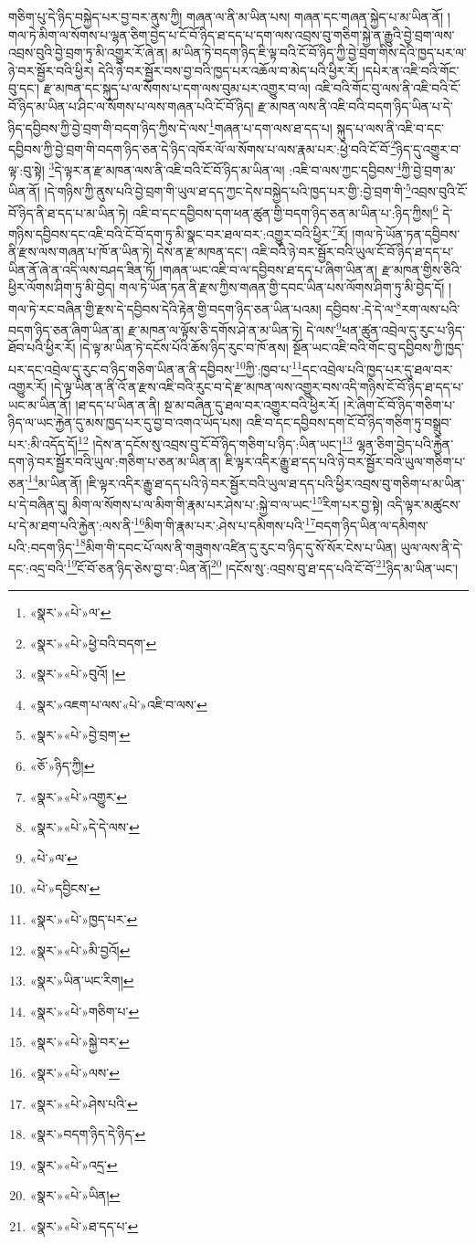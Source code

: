 གཅིག་པུ་དེ་ཉིད་བསྐྱེད་པར་བྱ་བར་ནུས་ཀྱི། གཞན་ལ་ནི་མ་ཡིན་པས། གཞན་དང་གཞན་སྐྱེད་པ་མ་ཡིན་ནོ། །གལ་ཏེ་མིག་ལ་སོགས་པ་ལྷན་ཅིག་བྱེད་པ་ངོ་བོ་ཉིད་ཐ་དད་པ་དག་ལས་འབྲས་བུ་གཅིག་སྐྱེ་ན་རྒྱུའི་བྱེ་བྲག་ལས་འབྲས་བུའི་བྱེ་བྲག་ཏུ་མི་འགྱུར་རོ་ཞེ་ན། མ་ཡིན་ཏེ་བདག་ཉིད་ཇི་ལྟ་བའི་ངོ་བོ་ཉིད་ཀྱི་བྱེ་བྲག་གིས་དེའི་ཁྱད་པར་ལ་ཉེ་བར་སྦྱོར་བའི་ཕྱིར། དེའི་ཉེ་བར་སྦྱོར་བས་བྱ་བའི་ཁྱད་པར་འཆོལ་བ་མེད་པའི་ཕྱིར་རོ། །དཔེར་ན་འཇི་བའི་གོང་བུ་དང་། རྫ་མཁན་དང་སྐུད་པ་ལ་སོགས་པ་དག་ལས་བུམ་པར་འགྱུར་བ་ལ། འཇི་བའི་གོང་བུ་ལས་ནི་འཇི་བའི་ངོ་བོ་ཉིད་མ་ཡིན་པ་ཤིང་ལ་སོགས་པ་ལས་གཞན་པའི་ངོ་བོ་ཉིད། རྫ་མཁན་ལས་ནི་འཇི་བའི་བདག་ཉིད་ཡིན་པ་དེ་ཉིད་དབྱིབས་ཀྱི་བྱེ་བྲག་གི་བདག་ཉིད་ཀྱིས་དེ་ལས་\footnote{«སྣར་»«པེ་»ལ་}གཞན་པ་དག་ལས་ཐ་དད་པ། སྐུད་པ་ལས་ནི་འཇི་བ་དང་དབྱིབས་ཀྱི་བྱེ་བྲག་གི་བདག་ཉིད་ཅན་དེ་ཉིད་འཁོར་ལོ་ལ་སོགས་པ་ལས་རྣམ་པར་:ཕྱེ་བའི་ངོ་བོ་\footnote{«སྣར་»«པེ་»ཕྱེ་བའི་བདག་}ཉིད་དུ་འགྱུར་བ་ལྟ་:བུ་སྟེ། \footnote{«སྣར་»«པེ་»བུའོ། ། }དེ་ལྟར་ན་རྫ་མཁན་ལས་ནི་འཇི་བའི་ངོ་བོ་ཉིད་མ་ཡིན་ལ། :འཇི་བ་ལས་ཀྱང་དབྱིབས་\footnote{«སྣར་»འཇག་པ་ལས་«པེ་»འཇི་བ་ལས་}ཀྱི་བྱེ་བྲག་མ་ཡིན་ནོ། །དེ་གཉིས་ཀྱི་ནུས་པའི་བྱེ་བྲག་གི་ཡུལ་ཐ་དད་ཀྱང་དེས་བསྐྱེད་པའི་ཁྱད་པར་གྱི་:བྱེ་བྲག་གི་\footnote{«སྣར་»«པེ་»བྱེ་བྲག་}འབྲས་བུའི་ངོ་བོ་ཉིད་ནི་ཐ་དད་པ་མ་ཡིན་ཏེ། འཇི་བ་དང་དབྱིབས་དག་ཕན་ཚུན་གྱི་བདག་ཉིད་ཅན་མ་ཡིན་པ་:ཉིད་ཀྱིས།\footnote{«ཅོ་»ཉིད་ཀྱི།} དེ་གཉིས་དབྱིབས་དང་འཇི་བའི་ངོ་བོ་དག་ཏུ་མི་སྣང་བར་ཐལ་བར་:འགྱུར་བའི་ཕྱིར་\footnote{«སྣར་»«པེ་»འགྱུར་}རོ། །གལ་ཏེ་ཡོན་ཏན་དབྱིབས་ནི་རྫས་ལས་གཞན་པ་ཁོ་ན་ཡིན་ཏེ། དེས་ན་རྫ་མཁན་དང་། འཇི་བའི་ཉེ་བར་སྦྱོར་བའི་ཡུལ་ངོ་བོ་ཉིད་ཐ་དད་པ་ཡིན་ནོ་ཞེ་ན་འདི་ལས་བཤད་ཟིན་ཏོ། །གཞན་ཡང་འཇི་བ་ལ་དབྱིབས་ཐ་དད་པ་ཞིག་ཡིན་ན། རྫ་མཁན་གྱིས་ཅིའི་ཕྱིར་ལོགས་ཤིག་ཏུ་མི་བྱེད། གལ་ཏེ་ཡོན་ཏན་ནི་རྫས་ཀྱིས་གཞན་གྱི་དབང་ཡིན་པས་ལོགས་ཤིག་ཏུ་མི་བྱེད་དོ། །གལ་ཏེ་རང་བཞིན་གྱི་རྫས་དེ་དབྱིབས་དེའི་རྟེན་གྱི་བདག་ཉིད་ཅན་ཡིན་པའམ། དབྱིབས་:དེ་དེ་ལ་\footnote{«སྣར་»«པེ་»དེ་དེ་ལས་}རག་ལས་པའི་བདག་ཉིད་ཅན་ཞིག་ཡིན་ན། རྫ་མཁན་ལ་ལྟོས་ཅི་དགོས་ཤེ་ན་མ་ཡིན་ཏེ། དེ་ལས་\footnote{«པེ་»ལ་}ཕན་ཚུན་འབྲེལ་དུ་རུང་པ་ཉིད་ཐོབ་པའི་ཕྱིར་རོ། །དེ་ལྟ་མ་ཡིན་ཏེ་དངོས་པོའི་ཆོས་ཉིད་རུང་བ་ཁོ་ནས། སྔོན་ཡང་འཇི་བའི་གོང་བུ་དབྱིབས་ཀྱི་ཁྱད་པར་དང་འབྲེལ་དུ་རུང་བ་ཉིད་གཅིག་ཡིན་ན་ནི་དབྱིབས་\footnote{«པེ་»དབྱིངས་}ཀྱི་:ཁྱབ་པ་\footnote{«སྣར་»«པེ་»ཁྱད་པར་}དང་འབྲེལ་པའི་ཁྱད་པར་དུ་ཐལ་བར་འགྱུར་རོ། །དེ་ལྟ་ཡིན་ན་ནི་འོ་ན་རྫས་འཇི་བའི་རུང་བ་དེ་རྫ་མཁན་ལས་འགྱུར་བས་འདི་གཉིས་ངོ་བོ་ཉིད་ཐ་དད་པ་ཡང་མ་ཡིན་ནོ། །ཐ་དད་པ་ཡིན་ན་ནི། སྔ་མ་བཞིན་དུ་ཐལ་བར་འགྱུར་བའི་ཕྱིར་རོ། །རེ་ཞིག་ངོ་བོ་ཉིད་གཅིག་པ་ཉིད་ལ་ཡང་རྐྱེན་དུ་མས་ཁྱད་པར་དུ་བྱ་བ་འགའ་ཡོད་པས། འཇི་བ་དང་དབྱིབས་དག་ངོ་བོ་ཉིད་གཅིག་ཏུ་བསྒྲུབ་པར་:མི་འདོད་དོ།\footnote{«སྣར་»«པེ་»མི་བྱའོ།} །དེས་ན་དངོས་སུ་འབྲས་བུ་ངོ་བོ་ཉིད་གཅིག་པ་ཉིད་:ཡིན་ཡང་།\footnote{«སྣར་»ཡིན་ཡང་རིག།} ལྷན་ཅིག་བྱེད་པའི་རྐྱེན་དག་ཉེ་བར་སྦྱོར་བའི་ཡུལ་:གཅིག་པ་ཅན་མ་ཡིན་ན། ཇི་ལྟར་འདིར་རྒྱུ་ཐ་དད་པའི་ཉེ་བར་སྦྱོར་བའི་ཡུལ་གཅིག་པ་ཅན་\footnote{«སྣར་»«པེ་»གཅིག་པ་}མ་ཡིན་ནོ། །ཇི་ལྟར་འདིར་རྒྱུ་ཐ་དད་པའི་ཉེ་བར་སྦྱོར་བའི་ཡུལ་ཐ་དད་པའི་ཕྱིར་འབྲས་བུ་གཅིག་པ་མ་ཡིན་པ་དེ་བཞིན་དུ། མིག་ལ་སོགས་པ་ལ་མིག་གི་རྣམ་པར་ཤེས་པ་:སྐྱེ་བ་ལ་ཡང་\footnote{«སྣར་»«པེ་»སྐྱེ་བར་}རིག་པར་བྱ་སྟེ། འདི་ལྟར་མཚུངས་པ་དེ་མ་ཐག་པའི་རྐྱེན་:ལས་ནི་\footnote{«སྣར་»«པེ་»ལས་}མིག་གི་རྣམ་པར་:ཤེས་པ་དམིགས་པའི་\footnote{«སྣར་»«པེ་»ཤེས་པའི་}བདག་ཉིད་ཡིན་ལ་དམིགས་པའི་:བདག་ཉིད་\footnote{«སྣར་»བདག་ཉིད་དེ་ཉིད་}མིག་གི་དབང་པོ་ལས་ནི་གཟུགས་འཛིན་དུ་རུང་བ་ཉིད་དུ་སོ་སོར་ངེས་པ་ཡིན། ཡུལ་ལས་ནི་དེ་དང་:འདྲ་བའི་\footnote{«སྣར་»«པེ་»འདྲ་}ངོ་བོ་ཅན་ཉིད་ཅེས་བྱ་བ་:ཡིན་ནོ།\footnote{«སྣར་»«པེ་»ཡིན།} །དངོས་སུ་:འབྲས་བུ་ཐ་དད་པའི་ངོ་བོ་\footnote{«སྣར་»«པེ་»ཐ་དད་པ་}ཉིད་མ་ཡིན་ཡང་། 